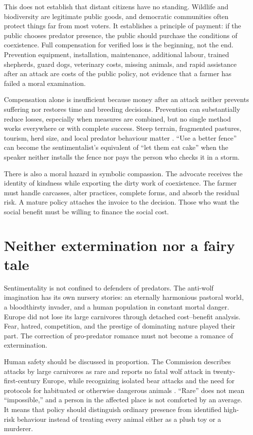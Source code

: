 ﻿\documentclass[12pt,a4paper]{book}
\begin{document}
This does not establish that distant citizens have no standing.  Wildlife and
biodiversity are legitimate public goods, and democratic communities often
protect things far from most voters.  It establishes a principle of payment:
if the public chooses predator presence, the public should purchase the
conditions of coexistence.  Full compensation for verified loss is the
beginning, not the end.  Prevention equipment, installation, maintenance,
additional labour, trained shepherds, guard dogs, veterinary costs, missing
animals, and rapid assistance after an attack are costs of the public policy,
not evidence that a farmer has failed a moral examination.

Compensation alone is insufficient because money after an attack neither
prevents suffering nor restores time and breeding decisions.  Prevention can
substantially reduce losses, especially when measures are combined, but no
single method works everywhere or with complete success.  Steep terrain,
fragmented pastures, tourism, herd size, and local predator behaviour matter
\cite{ECLargeCarnivoreFacts2026,AlpineConventionCarnivorePrevention2024}.
``Use a better fence'' can become the sentimentalist's equivalent of ``let
them eat cake'' when the speaker neither installs the fence nor pays the
person who checks it in a storm.

There is also a moral hazard in symbolic compassion.  The advocate receives
the identity of kindness while exporting the dirty work of coexistence.  The
farmer must handle carcasses, alter practices, complete forms, and absorb the
residual risk.  A mature policy attaches the invoice to the decision.  Those
who want the social benefit must be willing to finance the social cost.

\section{Neither extermination nor a fairy tale}

Sentimentality is not confined to defenders of predators.  The anti-wolf
imagination has its own nursery stories: an eternally harmonious pastoral
world, a bloodthirsty invader, and a human population in constant mortal
danger.  Europe did not lose its large carnivores through detached
cost--benefit analysis.  Fear, hatred, competition, and the prestige of
dominating nature played their part.  The correction of pro-predator romance
must not become a romance of extermination.

Human safety should be discussed in proportion.  The Commission describes
attacks by large carnivores as rare and reports no fatal wolf attack in
twenty-first-century Europe, while recognizing isolated bear attacks and the
need for protocols for habituated or otherwise dangerous animals
\cite{ECLargeCarnivoreFacts2026}.  ``Rare'' does not mean ``impossible,'' and a
person in the affected place is not comforted by an average.  It means that
policy should distinguish ordinary presence from identified high-risk
behaviour instead of treating every animal either as a plush toy or a murderer.
\end{document}
